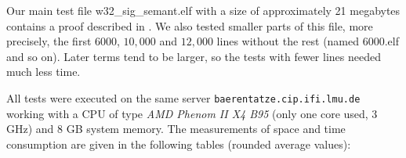 \documentclass[submission,copyright,creativecommons]{eptcs}
\begin{document}
Our main test file \textsf{w32\_sig\_semant.elf} with a size of
approximately 21 megabytes contains a proof described in
\cite{appel:toplas10}. We also tested smaller parts of this file, more
precisely, the first $6000$, $10,000$ and $12,000$ lines without the
rest (named \textsf{6000.elf} and so on). Later terms tend to be
larger, so the tests with fewer lines needed much less time.

All tests were executed on the same server 
\mbox{\texttt{baerentatze.cip.ifi.lmu.de}}
working with a CPU of type \emph{AMD Phenom II X4 B95} (only
one core used, 3 GHz) and 8 GB system memory. The measurements
of space and time consumption are given in the following tables (rounded
average values):
\end{document}
